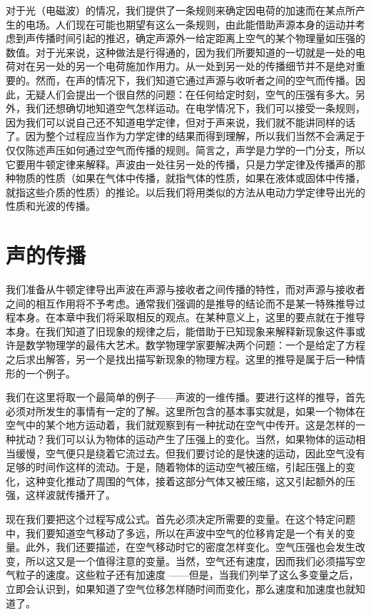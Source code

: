 对于光（电磁波）的情况，我们提供了一条规则来确定因电荷的加速而在某点所产生的电场。人们现在可能也期望有这么一条规则，由此能借助声源本身的运动并考虑到声传播时间引起的推迟，确定声源外一给定距离上空气的某个物理量如压强的数值。对于光来说，这种做法是行得通的，因为我们所要知道的一切就是一处的电荷对在另一处的另一个电荷施加作用力。从一处到另一处的传播细节并不是绝对重要的。然而，在声的情况下，我们知道它通过声源与收听者之间的空气而传播。因此，无疑人们会提出一个很自然的问题：在任何给定时刻，空气的压强有多大。另外，我们还想确切地知道空气怎样运动。在电学情况下，我们可以接受一条规则，因为我们可以说自己还不知道电学定律，但对于声来说，我们就不能讲同样的话了。因为整个过程应当作为力学定律的结果而得到理解，所以我们当然不会满足于仅仅陈述声压如何通过空气而传播的规则。简言之，声学是力学的一门分支，所以它要用牛顿定律来解释。声波由一处往另一处的传播，只是力学定律及传播声的那种物质的性质（如果在气体中传播，就指气体的性质，如果在液体或固体中传播，就指这些介质的性质）的推论。以后我们将用类似的方法从电动力学定律导出光的性质和光波的传播。

\section{声的传播}

我们准备从牛顿定律导出声波在声源与接收者之间传播的特性，而对声源与接收者之间的相互作用将不予考虑。通常我们强调的是推导的结论而不是某一特殊推导过程本身。在本章中我们将采取相反的观点。在某种意义上，这里的要点就在于推导本身。在我们知道了旧现象的规律之后，能借助于已知现象来解释新现象这件事或许是数学物理学的最伟大艺术。数学物理学家要解决两个问题：一个是给定了方程之后求出解答，另一个是找出描写新现象的物理方程。这里的推导是属于后一种情形的一个例子。

我们在这里将取一个最简单的例子——声波的一维传播。要进行这样的推导，首先必须对所发生的事情有一定的了解。这里所包含的基本事实就是，如果一个物体在空气中的某个地方运动着，我们就观察到有一种扰动在空气中传开。这是怎样的一种扰动？我们可以认为物体的运动产生了压强上的变化。当然，如果物体的运动相当缓慢，空气便只是绕着它流过去。但我们要讨论的是快速的运动，因此空气没有足够的时间作这样的流动。于是，随着物体的运动空气被压缩，引起压强上的变化，这种变化推动了周围的气体，接着这部分气体又被压缩，这又引起额外的压强，这样波就传播开了。

现在我们要把这个过程写成公式。首先必须决定所需要的变量。在这个特定问题中，我们要知道空气移动了多远，所以在声波中空气的位移肯定是一个有关的变量。此外，我们还要描述，在空气移动时它的密度怎样变化。空气压强也会发生改变，所以这又是一个值得注意的变量。当然，空气还有速度，因而我们必须描写空气粒子的速度。这些粒子还有加速度 ——但是，当我们列举了这么多变量之后，立即会认识到，如果知道了空气位移怎样随时间而变化，那么速度和加速度也就知道了。


